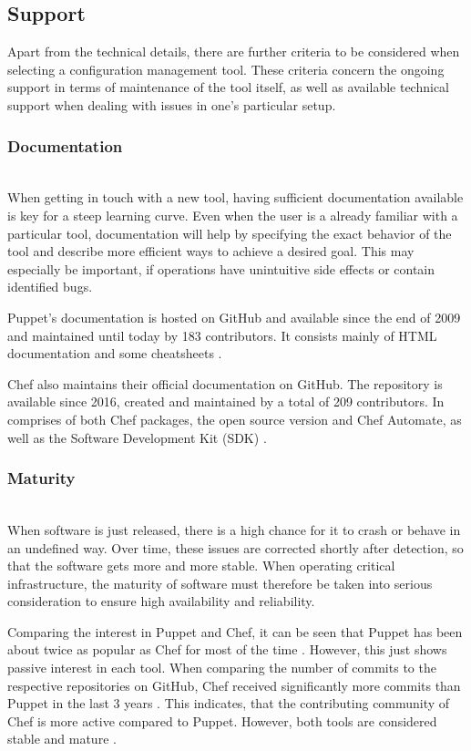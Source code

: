 \subsection{Support}

Apart from the technical details, there are further criteria to be considered when selecting a configuration management tool. These criteria concern the ongoing support in terms of maintenance of the tool itself, as well as available technical support when dealing with issues in one's particular setup.

\subsubsection{Documentation}\hfill\\
When getting in touch with a new tool, having sufficient documentation available is key for a steep learning curve. Even when the user is a already familiar with a particular tool, documentation will help by specifying the exact behavior of the tool and describe more efficient ways to achieve a desired goal. This may especially be important, if operations have unintuitive side effects or contain identified bugs.

Puppet's documentation is hosted on GitHub and available since the end of 2009 and maintained until today by 183 contributors. It consists mainly of HTML documentation and some cheatsheets \cite{githubpuppetdocs}.

Chef also maintains their official documentation on GitHub. The repository is available since 2016, created and maintained by a total of 209 contributors. In comprises of both Chef packages, the open source version and Chef Automate, as well as the Software Development Kit (SDK) \cite{githubchefdocs}.

\subsubsection{Maturity}\hfill\\
When software is just released, there is a high chance for it to crash or behave in an undefined way. Over time, these issues are corrected shortly after detection, so that the software gets more and more stable. When operating critical infrastructure, the maturity of software must therefore be taken into serious consideration to ensure high availability and reliability.

Comparing the interest in Puppet and Chef, it can be seen that Puppet has been about twice as  popular as Chef for most of the time \cite{googlepuppetvschef}. However, this just shows passive interest in each tool. When comparing the number of commits to the respective repositories on GitHub, Chef received significantly more commits than Puppet in the last 3 years \cite{githubpuppetpulse} \cite{githubchefpulse}. This indicates, that the contributing community of Chef is more active compared to Puppet. However, both tools are considered stable and mature \cite{delaet2010survey}.

